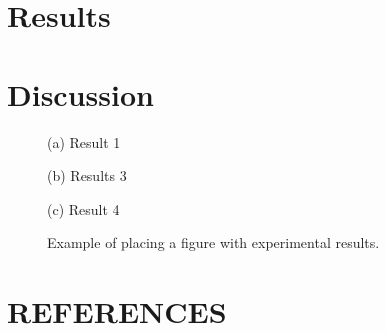 \documentclass{article}
\begin{document}
\section{Results}
\label{sec:res}

\section{Discussion}
\label{sec:dis}


\begin{figure}[htb]

\begin{minipage}[b]{1.0\linewidth}
  \centering
  \centerline{(a) Result 1}\medskip
\end{minipage}
%
\begin{minipage}[b]{.48\linewidth}
  \centering
  \centerline{(b) Results 3}\medskip
\end{minipage}
\hfill
\begin{minipage}[b]{0.48\linewidth}
  \centering
  \centerline{(c) Result 4}\medskip
\end{minipage}
%
\caption{Example of placing a figure with experimental results.}
\label{fig:res}
%
\end{figure}



\vfill\pagebreak

\section{REFERENCES}
\label{sec:ref}

%
\end{document}
